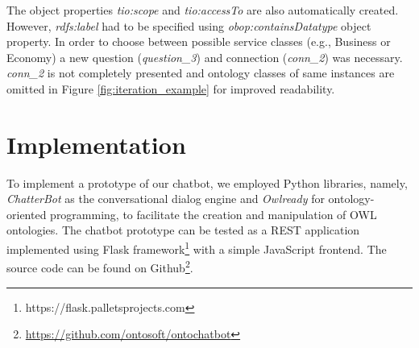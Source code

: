 \documentclass[runningheads]{llncs}
\begin{document}
The object properties \textit{tio:scope} and \textit{tio:accessTo} are also automatically created. However, \textit{rdfs:label} had to be specified using \textit{obop:containsDatatype} object property. In order to choose between possible service classes (e.g., Business or Economy) a new question (\textit{question\_3}) and connection (\textit{conn\_2}) was necessary. \textit{conn\_2} is not completely presented and ontology classes of same instances are omitted in Figure \ref{fig:iteration_example} for improved readability. 


\FloatBarrier 
\section {Implementation}
To implement a prototype of our chatbot, we employed Python libraries, namely, \textit{ChatterBot} as the conversational dialog engine and \textit{Owlready} \cite{lamy2017owlready} for ontology-oriented programming, to facilitate the creation and manipulation of OWL ontologies. The chatbot prototype can be tested as a REST application implemented using Flask framework\footnote{\label{flaskfootnote}https://flask.palletsprojects.com} with a simple JavaScript frontend. The source code can be found on Github\footnote{\url{https://github.com/ontosoft/ontochatbot}}. 
\end{document}
